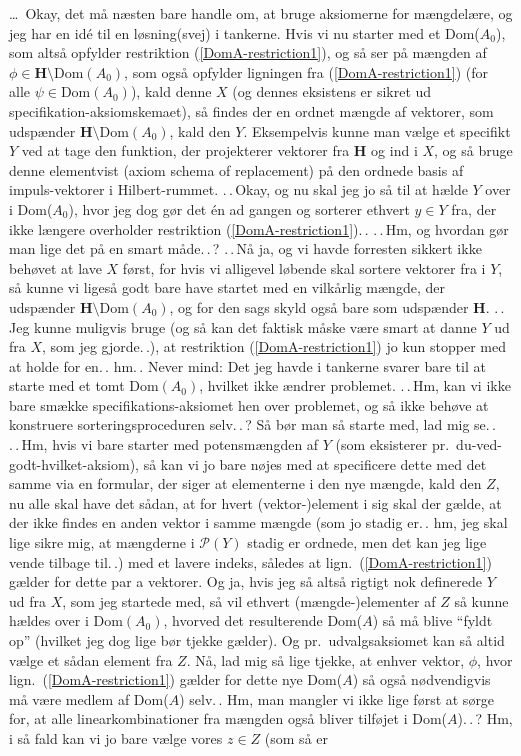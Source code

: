 \documentclass{report}
\begin{document}
\ldots\ Okay, det må næsten bare handle om, at bruge aksiomerne for mængdelære, og jeg har en idé til en løsning(svej) i tankerne. Hvis vi nu starter med et Dom($A_0$), som altså opfylder restriktion (\ref{DomA-restriction1}), og så ser på mængden af $\phi\in \mathrm{\textbf{H}} \setminus \mathrm{Dom}(A_0)$, som også opfylder ligningen fra (\ref{DomA-restriction1}) (for alle $\psi\in\mathrm{Dom}(A_0)$), kald denne $X$ (og dennes eksistens er sikret ud specifikation-aksiomskemaet), så findes der en ordnet mængde af vektorer, som udspænder $\mathrm{\textbf{H}} \setminus \mathrm{Dom}(A_0)$, kald den $Y$. Eksempelvis kunne man vælge et specifikt $Y$ ved at tage den funktion, der projekterer vektorer fra \textbf{H} og ind i $X$, og så bruge denne elementvist (axiom schema of replacement) på den ordnede basis af impuls-vektorer i Hilbert-rummet. .\,.\,Okay, og nu skal jeg jo så til at hælde $Y$ over i Dom($A_0$), hvor jeg dog gør det én ad gangen og sorterer ethvert $y\in Y$ fra, der ikke længere overholder restriktion (\ref{DomA-restriction1}).\,. .\,.\,Hm, og hvordan gør man lige det på en smart måde.\,.\,? .\,.\,Nå ja, og vi havde forresten sikkert ikke behøvet at lave $X$ først, for hvis vi alligevel løbende skal sortere vektorer fra i $Y$, så kunne vi ligeså godt bare have startet med en vilkårlig mængde, der udspænder $\mathrm{\textbf{H}} \setminus \mathrm{Dom}(A_0)$, og for den sags skyld også bare som udspænder $\mathrm{\textbf{H}}$. .\,.\,Jeg kunne muligvis bruge (og så kan det faktisk måske være smart at danne $Y$ ud fra $X$, som jeg gjorde.\,.), at restriktion (\ref{DomA-restriction1}) jo kun stopper med at holde for en.\,. hm.\,. Never mind: Det jeg havde i tankerne svarer bare til at starte med et tomt Dom$(A_0)$, hvilket ikke ændrer problemet. .\,.\,Hm, kan vi ikke bare smække specifikations-aksiomet hen over problemet, og så ikke behøve at konstruere sorteringsproceduren selv.\,.\,? Så bør man så starte med, lad mig se.\,. .\,.\,Hm, hvis vi bare starter med potensmængden af $Y$ (som eksisterer pr.\ du-ved-godt-hvilket-aksiom), så kan vi jo bare nøjes med at specificere dette med det samme via en formular, der siger at elementerne i den nye mængde, kald den $Z$, nu alle skal have det sådan, at for hvert (vektor-)element i sig skal der gælde, at der ikke findes en anden vektor i samme mængde (som jo stadig er.\,. hm, jeg skal lige sikre mig, at mængderne i $\mathcal{P}(Y)$ stadig er ordnede, men det kan jeg lige vende tilbage til.\,.) med et lavere indeks, således at lign.\ (\ref{DomA-restriction1}) gælder for dette par a vektorer. Og ja, hvis jeg så altså rigtigt nok definerede $Y$ ud fra $X$, som jeg startede med, så vil ethvert (mængde-)elementer af $Z$ så kunne hældes over i Dom$(A_0)$, hvorved det resulterende Dom($A$) så må blive ``fyldt op'' (hvilket jeg dog lige bør tjekke gælder). Og pr.\ udvalgsaksiomet kan så altid vælge et sådan element fra $Z$. Nå, lad mig så lige tjekke, at enhver vektor, $\phi$, hvor lign.\ (\ref{DomA-restriction1}) gælder for dette nye Dom($A$) så også nødvendigvis må være medlem af Dom($A$) selv.\,. Hm, man mangler vi ikke lige først at sørge for, at alle linearkombinationer fra mængden også bliver tilføjet i Dom($A$).\,.\,? Hm, i så fald kan vi jo bare vælge vores $z\in Z$ (som så er 
\end{document}
